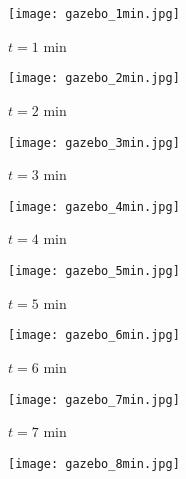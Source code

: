 \begin{figure}[!t]
	\centering
    	\begin{subfigure}[t]{0.24\columnwidth}
           	\centering
          	\texttt{[image: gazebo\_1min.jpg]}
        		\caption{$t=1$ min}
    	\end{subfigure}
    	\begin{subfigure}[t]{0.24\columnwidth}
           	\centering
          	\texttt{[image: gazebo\_2min.jpg]}
        		\caption{$t=2$ min}
    	\end{subfigure}
    	\begin{subfigure}[t]{0.24\columnwidth}
           	\centering
          	\texttt{[image: gazebo\_3min.jpg]}
        		\caption{$t=3$ min}
   	\end{subfigure}
    	\begin{subfigure}[t]{0.24\columnwidth}
           	\centering
          	\texttt{[image: gazebo\_4min.jpg]}
        		\caption{$t=4$ min}
    	\end{subfigure}
	\begin{subfigure}[t]{0.24\columnwidth}
	\vspace*{0.15\columnwidth}
           	\centering
          	\texttt{[image: gazebo\_5min.jpg]}
        		\caption{$t=5$ min}
    	\end{subfigure}
    	\begin{subfigure}[t]{0.24\columnwidth}
	\vspace*{0.15\columnwidth}
           	\centering
          	\texttt{[image: gazebo\_6min.jpg]}
        		\caption{$t=6$ min}
    	\end{subfigure}
    	\begin{subfigure}[t]{0.24\columnwidth}
	\vspace*{0.15\columnwidth}
           	\centering
          	\texttt{[image: gazebo\_7min.jpg]}
        		\caption{$t=7$ min}
   	\end{subfigure}
    	\begin{subfigure}[t]{0.24\columnwidth}
	\vspace*{0.15\columnwidth}
           	\centering
          	\texttt{[image: gazebo\_8min.jpg]}

\end{subfigure}
\end{figure}
